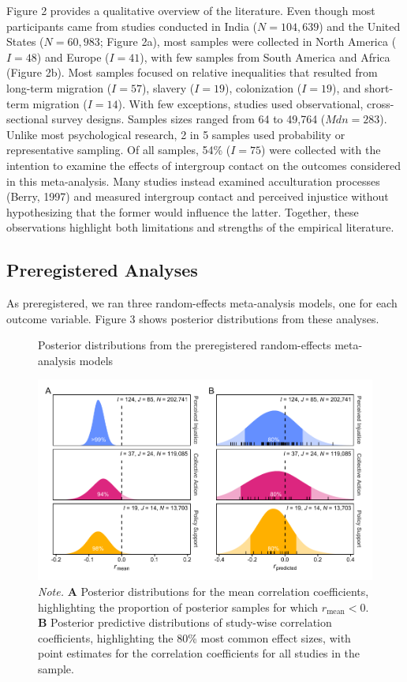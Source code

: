 \documentclass[12pt, letterpaper]{article}
\begin{document}
Figure 2 provides a qualitative overview of the literature. Even though
most participants came from studies conducted in India (\(N = 104,639\))
and the United States (\(N = 60,983\); Figure 2a), most samples were
collected in North America (\(I = 48\)) and Europe (\(I = 41\)), with
few samples from South America and Africa (Figure 2b). Most samples
focused on relative inequalities that resulted from long-term migration
(\(I = 57\)), slavery (\(I = 19\)), colonization (\(I = 19\)), and
short-term migration (\(I = 14\)). With few exceptions, studies used
observational, cross-sectional survey designs. Samples sizes ranged from
64 to 49,764 (\(\textit{Mdn} = 283\)). Unlike most psychological
research, 2 in 5 samples used probability or representative sampling. Of
all samples, 54\% (\(I = 75\)) were collected with the intention to
examine the effects of intergroup contact on the outcomes considered in
this meta-analysis. Many studies instead examined acculturation
processes (Berry, 1997) and measured intergroup contact and perceived
injustice without hypothesizing that the former would influence the
latter. Together, these observations highlight both limitations and
strengths of the empirical literature.

\hypertarget{preregistered-analyses-1}{%
\subsection{Preregistered Analyses}\label{preregistered-analyses-1}}

As preregistered, we ran three random-effects meta-analysis models, one
for each outcome variable. Figure 3 shows posterior distributions from
these analyses.

\begin{figure}[t!]
\centering
\caption{Posterior distributions from the preregistered random-effects meta-analysis models}
\includegraphics[scale=1]{../figures/figure-3}
\caption*{\textit{Note.} \textbf{A} Posterior distributions for the mean correlation coefficients, highlighting the proportion of posterior samples for which $r_\text{mean} < 0$. \textbf{B} Posterior predictive distributions of study-wise correlation coefficients, highlighting the 80\% most common effect sizes, with point estimates for the correlation coefficients for all studies in the sample.}
\label{fig:f3}
\end{figure}
\end{document}
